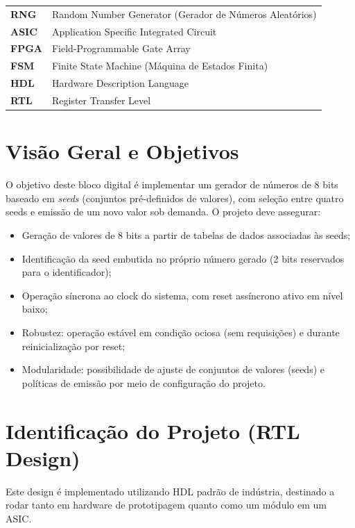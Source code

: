 \documentclass[12pt, a4paper]{article}
\begin{document}
	\begin{tabular}{ll}
		\textbf{RNG}  & Random Number Generator (Gerador de Números Aleatórios) \\
		\textbf{ASIC} & Application Specific Integrated Circuit \\
		\textbf{FPGA} & Field-Programmable Gate Array \\
		\textbf{FSM}  & Finite State Machine (Máquina de Estados Finita) \\
		\textbf{HDL}  & Hardware Description Language \\
		\textbf{RTL}  & Register Transfer Level \\
	\end{tabular}
	
	\newpage
	
	
	\section{Visão Geral e Objetivos}
	
	O objetivo deste bloco digital é implementar um gerador de números de 8 bits baseado em \textit{seeds} (conjuntos pré-definidos de valores), com seleção entre quatro seeds e emissão de um novo valor sob demanda. O projeto deve assegurar:
	
	\begin{itemize}
		\item Geração de valores de 8 bits a partir de tabelas de dados associadas às seeds;
		\item Identificação da seed embutida no próprio número gerado (2 bits reservados para o identificador);
		\item Operação síncrona ao clock do sistema, com reset assíncrono ativo em nível baixo;
		\item Robustez: operação estável em condição ociosa (sem requisições) e durante reinicialização por reset;
		\item Modularidade: possibilidade de ajuste de conjuntos de valores (seeds) e políticas de emissão por meio de configuração do projeto.
	\end{itemize}
	
	\section{Identificação do Projeto (RTL Design)}
	Este design é implementado utilizando HDL padrão de indústria, destinado a rodar tanto em hardware de prototipagem quanto como um módulo em um ASIC.
	
\end{document}
